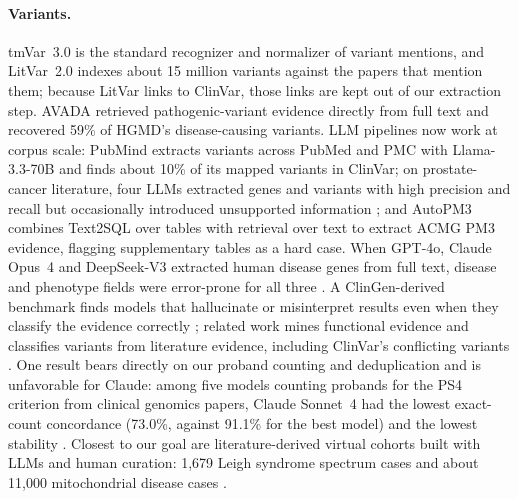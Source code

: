 \documentclass{article} %
\begin{document}
\paragraph{Variants.} tmVar~3.0 \citep{wei2022_tmvar3} is the standard recognizer and normalizer of variant mentions, and LitVar~2.0 \citep{allot2023_litvar2} indexes about 15 million variants against the papers that mention them; because LitVar links to ClinVar, those links are kept out of our extraction step. AVADA \citep{birgmeier2020_avada} retrieved pathogenic-variant evidence directly from full text and recovered 59\% of HGMD's disease-causing variants. LLM pipelines now work at corpus scale: PubMind \citep{wang2025_pubmind} extracts variants across PubMed and PMC with Llama-3.3-70B and finds about 10\% of its mapped variants in ClinVar; on prostate-cancer literature, four LLMs extracted genes and variants with high precision and recall but occasionally introduced unsupported information \citep{Wosny2025LargeLanguage}; and AutoPM3 \citep{li2025_autopm3} combines Text2SQL over tables with retrieval over text to extract ACMG PM3 evidence, flagging supplementary tables as a hard case. When GPT-4o, Claude Opus~4 and DeepSeek-V3 extracted human disease genes from full text, disease and phenotype fields were error-prone for all three \citep{yin2025_llm_disease_genes}. A ClinGen-derived benchmark finds models that hallucinate or misinterpret results even when they classify the evidence correctly \citep{Queen2025CgbenchBenchmarking}; related work mines functional evidence \citep{saadat2026_functional_evidence} and classifies variants from literature evidence, including ClinVar's conflicting variants \citep{ma2026_aicura}. One result bears directly on our proband counting and deduplication and is unfavorable for Claude: among five models counting probands for the PS4 criterion from clinical genomics papers, Claude Sonnet~4 had the lowest exact-count concordance (73.0\%, against 91.1\% for the best model) and the lowest stability \citep{murugan2026_reasoning_llm_ps4}. Closest to our goal are literature-derived virtual cohorts built with LLMs and human curation: 1,679 Leigh syndrome spectrum cases \citep{Shen2026GenerativeAi} and about 11,000 mitochondrial disease cases \citep{Shen2026MseqdrPmdvr}.
\end{document}
